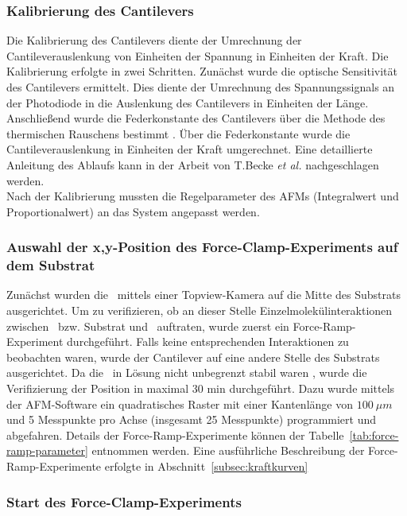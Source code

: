 \subsubsection{Kalibrierung des Cantilevers}
\label{subsubsec:kalibrierung_des_cantilevers}

Die Kalibrierung des Cantilevers diente der Umrechnung der Cantileverauslenkung von Einheiten der Spannung in Einheiten der Kraft. Die Kalibrierung erfolgte in zwei Schritten. Zunächst wurde die optische Sensitivität des Cantilevers ermittelt. Dies diente der Umrechnung des Spannungssignals an der Photodiode in die Auslenkung des Cantilevers in Einheiten der Länge. Anschließend wurde die Federkonstante des Cantilevers über die Methode des thermischen Rauschens bestimmt \cite{Butt.1995}. Über die Federkonstante wurde die Cantileverauslenkung in Einheiten der Kraft umgerechnet. Eine detaillierte Anleitung des Ablaufs kann in der Arbeit von T.Becke \textit{et al.} \cite{Becke.2018} nachgeschlagen werden.\\
Nach der Kalibrierung mussten die Regelparameter des \acp{AFM} (Integralwert und Proportionalwert) an das System angepasst werden.

\subsubsection{Auswahl der x,y-Position des Force-Clamp-Experiments auf dem Substrat}
\label{subsubsec:auswahl_der_x_y_position_des_force_clamp_experiments_auf_dem_substrat}

Zunächst wurden die \spitzen~mittels einer Topview-Kamera auf die Mitte des Substrats ausgerichtet. Um zu verifizieren, ob an dieser Stelle Einzelmolekülinteraktionen zwischen \spitze~bzw. Substrat und \spacer~auftraten, wurde zuerst ein Force-Ramp-Experiment durchgeführt. Falls keine entsprechenden Interaktionen zu beobachten waren, wurde der Cantilever auf eine andere Stelle des Substrats ausgerichtet. Da die \ester~in Lösung nicht unbegrenzt stabil waren \cite{Hayworth}, wurde die Verifizierung der Position in maximal 30 min durchgeführt. Dazu wurde mittels der \ac{AFM}-Software ein quadratisches Raster mit einer Kantenlänge von $100~\mu m$ und 5 Messpunkte pro Achse (insgesamt 25 Messpunkte) programmiert und abgefahren. Details der Force-Ramp-Experimente können der Tabelle~\ref{tab:force-ramp-parameter} entnommen werden. Eine ausführliche Beschreibung der Force-Ramp-Experimente erfolgte in Abschnitt~\ref{subsec:kraftkurven}

\subsubsection{Start des Force-Clamp-Experiments}
\label{subsubsec:start des force-clamp-experiments}

